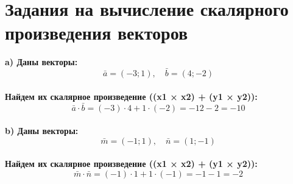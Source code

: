 \documentclass[12pt]{article}
\begin{document}
\section*{Задания на вычисление скалярного произведения векторов}

\textbf{a) Даны векторы:}
\[
\bar{a} = (-3; 1), \quad \bar{b} = (4; -2)
\]
\textbf{}\\
\textbf{Найдем их скалярное произведение ((x1 × x2) + (y1 × y2)):}
\[
\bar{a} \cdot \bar{b} = (-3) \cdot 4 + 1 \cdot (-2) = -12 - 2 = -10
\]
\textbf{}\\
\textbf{b) Даны векторы:}
\[
\bar{m} = (-1; 1), \quad \bar{n} = (1; -1)
\]
\textbf{}\\
\textbf{Найдем их скалярное произведение ((x1 × x2) + (y1 × y2)):}
\[
\bar{m} \cdot \bar{n} = (-1) \cdot 1 + 1 \cdot (-1) = -1 - 1 = -2
\]
\end{document}
